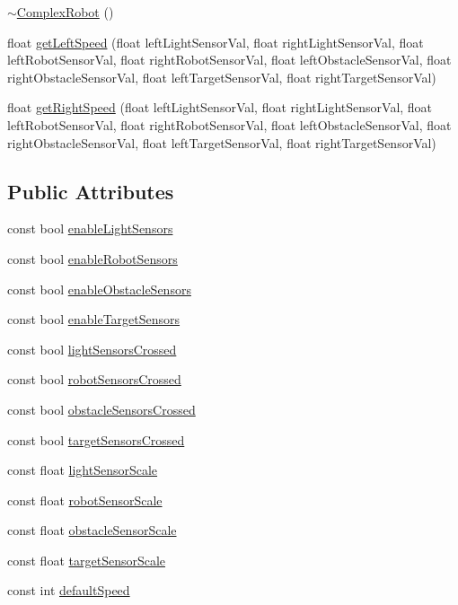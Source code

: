 \begin{DoxyCompactItemize}
\item 
\hyperlink{classComplexRobot_a4ce778d818e7ad00d2ef47a387f12865}{$\sim$\-Complex\-Robot} ()
\item 
float \hyperlink{classComplexRobot_aa50c7f5ed4f288987fe2557b41a9bf32}{get\-Left\-Speed} (float left\-Light\-Sensor\-Val, float right\-Light\-Sensor\-Val, float left\-Robot\-Sensor\-Val, float right\-Robot\-Sensor\-Val, float left\-Obstacle\-Sensor\-Val, float right\-Obstacle\-Sensor\-Val, float left\-Target\-Sensor\-Val, float right\-Target\-Sensor\-Val)
\item 
float \hyperlink{classComplexRobot_ac038c2dbcc242d68a3ef9e533673bdf6}{get\-Right\-Speed} (float left\-Light\-Sensor\-Val, float right\-Light\-Sensor\-Val, float left\-Robot\-Sensor\-Val, float right\-Robot\-Sensor\-Val, float left\-Obstacle\-Sensor\-Val, float right\-Obstacle\-Sensor\-Val, float left\-Target\-Sensor\-Val, float right\-Target\-Sensor\-Val)
\end{DoxyCompactItemize}
\subsection*{Public Attributes}
\begin{DoxyCompactItemize}
\item 
const bool \hyperlink{classComplexRobot_a371e0363adebfa9898b7db2827e62216}{enable\-Light\-Sensors}
\item 
const bool \hyperlink{classComplexRobot_afbd7060c1ba7505825bd8a6d87755c57}{enable\-Robot\-Sensors}
\item 
const bool \hyperlink{classComplexRobot_a1a92f81d958c5497dad6c0fb470193e6}{enable\-Obstacle\-Sensors}
\item 
const bool \hyperlink{classComplexRobot_a5480d20648fefda9eab9e3a31cb74a8e}{enable\-Target\-Sensors}
\item 
const bool \hyperlink{classComplexRobot_a56421342335d639c79fce6c4087e92ba}{light\-Sensors\-Crossed}
\item 
const bool \hyperlink{classComplexRobot_a329fa033f98c4611fc6fd08f1ec0c1a2}{robot\-Sensors\-Crossed}
\item 
const bool \hyperlink{classComplexRobot_aa1bbfff6b94d790366c903e8ee9d7c35}{obstacle\-Sensors\-Crossed}
\item 
const bool \hyperlink{classComplexRobot_ac7fa0582f9c586b38c1dc73382a1c5a9}{target\-Sensors\-Crossed}
\item 
const float \hyperlink{classComplexRobot_afb1bda51a4a0d99fa2eea1fe8f7ee240}{light\-Sensor\-Scale}
\item 
const float \hyperlink{classComplexRobot_ac433b802cfc866917bc32680357e0b3e}{robot\-Sensor\-Scale}
\item 
const float \hyperlink{classComplexRobot_a62e4d0dafe87412f5d868a3a7a462209}{obstacle\-Sensor\-Scale}
\item 
const float \hyperlink{classComplexRobot_a95cae4898e63c23418684c87e6ab0176}{target\-Sensor\-Scale}
\item 
const int \hyperlink{classComplexRobot_a38ae464727dfb577e24a2b4c1a305e5d}{default\-Speed}
\end{DoxyCompactItemize}
